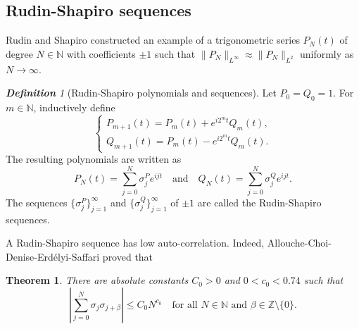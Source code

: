 \documentclass[12pt,reqno]{amsart}
\newcommand\N{\mathbb{N}}
\newcommand\Z{\mathbb{Z}}
\theoremstyle{plain}
\newtheorem{thm}{Theorem}
\theoremstyle{remark}
\newtheorem*{defn}{\textbf{Definition}}
\numberwithin{equation}{section}
\begin{document}
\subsection{Rudin-Shapiro sequences}\label{sec:RS}
Rudin and Shapiro \cite[Theorem 1]{R} constructed an example of a trigonometric series $P_N(t)$ of degree $N\in\N$ with coefficients $\pm1$ such that $\|P_N\|_{L^\infty}\approx\|P_N\|_{L^2}$ uniformly as $N\to\infty$.
\begin{defn}[Rudin-Shapiro polynomials and sequences]
Let $P_0=Q_0=1$. For $m\in\N$, inductively define
$$\begin{cases}
P_{m+1}(t)=P_m(t)+e^{i2^mt}Q_m(t),\\
Q_{m+1}(t)=P_m(t)-e^{i2^mt}Q_m(t).
\end{cases}$$
The resulting polynomials are written as
$$P_N(t)=\sum_{j=0}^N\sigma_j^Pe^{ijt}\quad\text{and}\quad Q_N(t)=\sum_{j=0}^N\sigma_j^Qe^{ijt}.$$
The sequences $\{\sigma_j^P\}_{j=1}^\infty$ and $\{\sigma_j^Q\}_{j=1}^\infty$ of $\pm1$ are called the Rudin-Shapiro sequences.
\end{defn}

A Rudin-Shapiro sequence has low auto-correlation. Indeed, Allouche-Choi-Denise-Erd\'elyi-Saffari \cite{ACDES} proved that
\begin{thm}\label{thm:auto}
There are absolute constants $C_0>0$ and $0<c_0<0.74$ such that
$$\left|\sum_{j=0}^N\sigma_j\sigma_{j+\beta}\right|\le C_0N^{c_0}\quad\text{for all }N\in\N\text{ and }\beta\in\Z\setminus\{0\}.$$
\end{thm}
\end{document}
